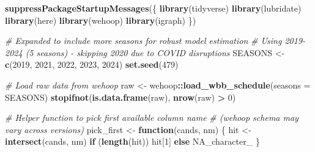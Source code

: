 \documentclass[
]{article}
\newenvironment{Shaded}{\begin{snugshade}}{\end{snugshade}}
\newcommand{\AttributeTok}[1]{\textcolor[rgb]{0.13,0.29,0.53}{#1}}
\newcommand{\CommentTok}[1]{\textcolor[rgb]{0.56,0.35,0.01}{\textit{#1}}}
\newcommand{\ConstantTok}[1]{\textcolor[rgb]{0.56,0.35,0.01}{#1}}
\newcommand{\ControlFlowTok}[1]{\textcolor[rgb]{0.13,0.29,0.53}{\textbf{#1}}}
\newcommand{\DecValTok}[1]{\textcolor[rgb]{0.00,0.00,0.81}{#1}}
\newcommand{\FunctionTok}[1]{\textcolor[rgb]{0.13,0.29,0.53}{\textbf{#1}}}
\newcommand{\NormalTok}[1]{#1}
\newcommand{\OtherTok}[1]{\textcolor[rgb]{0.56,0.35,0.01}{#1}}
\newcommand{\SpecialCharTok}[1]{\textcolor[rgb]{0.81,0.36,0.00}{\textbf{#1}}}
\begin{document}
\begin{Shaded}
\begin{Highlighting}[]
\FunctionTok{suppressPackageStartupMessages}\NormalTok{(\{}
    \FunctionTok{library}\NormalTok{(tidyverse)}
    \FunctionTok{library}\NormalTok{(lubridate)}
    \FunctionTok{library}\NormalTok{(here)}
    \FunctionTok{library}\NormalTok{(wehoop)}
    \FunctionTok{library}\NormalTok{(igraph)}
\NormalTok{\})}

\CommentTok{\# Expanded to include more seasons for robust model estimation}
\CommentTok{\# Using 2019{-}2024 (5 seasons) {-} skipping 2020 due to COVID disruptions}
\NormalTok{SEASONS }\OtherTok{\textless{}{-}} \FunctionTok{c}\NormalTok{(}\DecValTok{2019}\NormalTok{, }\DecValTok{2021}\NormalTok{, }\DecValTok{2022}\NormalTok{, }\DecValTok{2023}\NormalTok{, }\DecValTok{2024}\NormalTok{)}
\FunctionTok{set.seed}\NormalTok{(}\DecValTok{479}\NormalTok{)}

\CommentTok{\# Load raw data from wehoop}
\NormalTok{raw }\OtherTok{\textless{}{-}}\NormalTok{ wehoop}\SpecialCharTok{::}\FunctionTok{load\_wbb\_schedule}\NormalTok{(}\AttributeTok{seasons =}\NormalTok{ SEASONS)}
\FunctionTok{stopifnot}\NormalTok{(}\FunctionTok{is.data.frame}\NormalTok{(raw), }\FunctionTok{nrow}\NormalTok{(raw) }\SpecialCharTok{\textgreater{}} \DecValTok{0}\NormalTok{)}

\CommentTok{\# Helper function to pick first available column name}
\CommentTok{\# (wehoop schema may vary across versions)}
\NormalTok{pick\_first }\OtherTok{\textless{}{-}} \ControlFlowTok{function}\NormalTok{(cands, nm) \{}
\NormalTok{    hit }\OtherTok{\textless{}{-}} \FunctionTok{intersect}\NormalTok{(cands, nm)}
    \ControlFlowTok{if}\NormalTok{ (}\FunctionTok{length}\NormalTok{(hit)) hit[}\DecValTok{1}\NormalTok{] }\ControlFlowTok{else} \ConstantTok{NA\_character\_}
\NormalTok{\}}


\end{Highlighting}
\end{Shaded}
\end{document}
